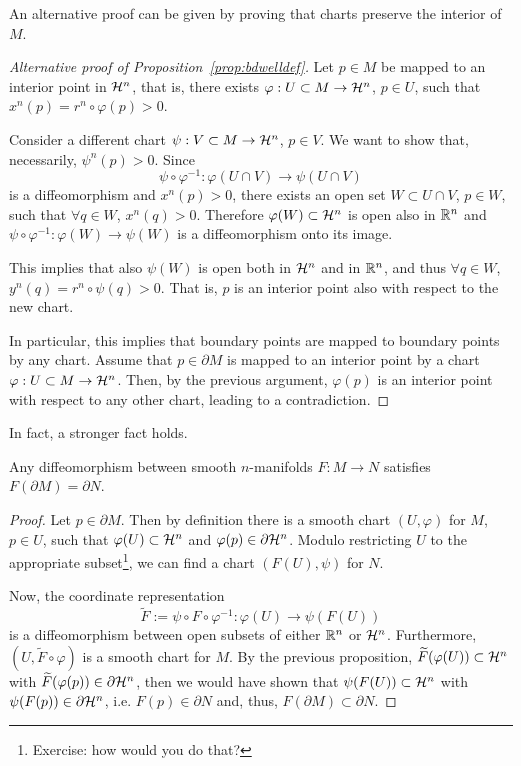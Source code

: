 An alternative proof can be given by proving that charts preserve the interior of $M$.

\begin{proof}[Alternative proof of Proposition~\ref{prop:bdwelldef}]
	Let $p\in M$ be mapped to an interior point in $\mathcal{H}^n$, that is, there exists $\varphi: U\subset M \to \mathcal{H}^n$, $p\in U$, such that $x^n(p) = r^n\circ\varphi(p) > 0$.

	Consider a different chart $\psi:V\subset M\to \mathcal{H}^n$, $p\in V$.
	We want to show that, necessarily, $\psi^n(p) > 0$. Since
	\begin{equation}\label{eq:trans-int-chart}
		\psi\circ\varphi^{-1} : \varphi(U\cap V) \to \psi(U\cap V)
	\end{equation}
	is a diffeomorphism and $x^n(p) > 0$, there exists an open set $W\subset U\cap V$, $p\in W$, such that $\forall q\in W$, $x^n(q) > 0$.
	Therefore $\varphi(W)\subset \mathcal{H}^n$ is open also in $\mathbb{R}^n$ and $\psi\circ\varphi^{-1} : \varphi(W) \to \psi(W)$ is a diffeomorphism onto its image.

	This implies that also $\psi(W)$ is open both in $\mathcal{H}^n$ and in $\mathbb{R}^n$, and thus $\forall q \in W$, $y^n(q) = r^n\circ \psi(q) > 0$. That is, $p$ is an interior point also with respect to the new chart.

	In particular, this implies that boundary points are mapped to boundary points by any chart. Assume that $p\in\partial M$ is mapped to an interior point by a chart $\varphi: U\subset M \to \mathcal{H}^n$. Then, by the previous argument, $\varphi(p)$ is an interior point with respect to any other chart, leading to a contradiction.
\end{proof}

In fact, a stronger fact holds.
\begin{proposition}
	Any diffeomorphism between smooth $n$-manifolds $F: M \to N$ satisfies $F(\partial M) = \partial N$.
\end{proposition}
\begin{proof}
	Let $p\in\partial M$.
	Then by definition there is a smooth chart $(U,\varphi)$ for $M$, $p\in U$, such that $\varphi(U)\subset\mathcal{H}^n$ and $\varphi(p)\in\partial\mathcal{H}^n$.
	Modulo restricting $U$ to the appropriate subset\footnote{Exercise: how would you do that?}, we can find a chart $(F(U), \psi)$ for $N$.

	Now, the coordinate representation
	\begin{equation}
		\widetilde{F} := \psi \circ F \circ \varphi^{-1} : \varphi(U) \to \psi(F(U))
	\end{equation}
	is a diffeomorphism between open subsets of either $\mathbb{R}^n$ or $\mathcal{H}^n$.
	Furthermore, $(U, \widetilde{F}\circ\varphi)$ is a smooth chart for $M$.
	By the previous proposition, $\widetilde{F}(\varphi(U))\subset \mathcal{H}^n$ with $\widetilde{F}(\varphi(p))\in\partial \mathcal{H}^n$, then we would have shown that $\psi(F(U)) \subset \mathcal{H}^n$ with $\psi(F(p))\in\partial\mathcal{H}^n$, i.e. $F(p)\in \partial N$ and, thus, $F(\partial M)\subset \partial N$.
\end{proof}

